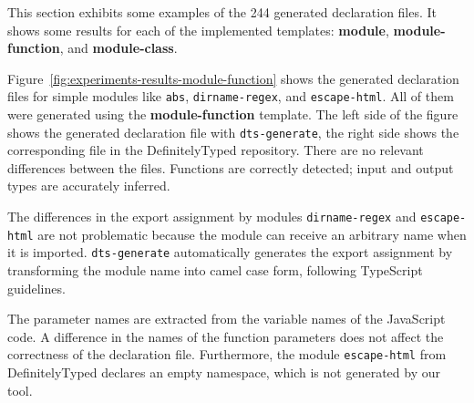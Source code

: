 \documentclass[english,cleveref,autoref,submission]{programming}
\newcommand{\figref}[1]{Figure~\ref{#1}}
\begin{document}

This section exhibits some examples of the 244 generated
declaration files. It shows some results for each of the implemented
templates: \textbf{module}, \textbf{module-function}, and
\textbf{module-class}. 

\figref{fig:experiments-results-module-function} shows the generated
declaration files for simple modules like \texttt{abs},
\texttt{dirname-regex}, and \texttt{escape-html}. All of them were
generated using the \textbf{module-function} template. The left side of the figure shows
the generated declaration file with 
\lstinline{dts-generate}, the right side shows the corresponding file
in the DefinitelyTyped repository. There are no relevant
differences between the files. Functions are correctly detected; input and output types are accurately inferred.

The differences in the export assignment by modules \texttt{dirname-regex} and
\texttt{escape-html} are not problematic because the module can receive an arbitrary 
name when it is imported. \texttt{dts-generate} automatically generates the export
assignment by transforming the module name into camel case form, following TypeScript
guidelines.

The parameter names are extracted from the variable names of the JavaScript
code.
A difference in the names of the function parameters does not affect the correctness of
the declaration file.
Furthermore, the module \texttt{escape-html} from DefinitelyTyped declares an empty
namespace, which is not generated by our tool.
 
\end{document}
